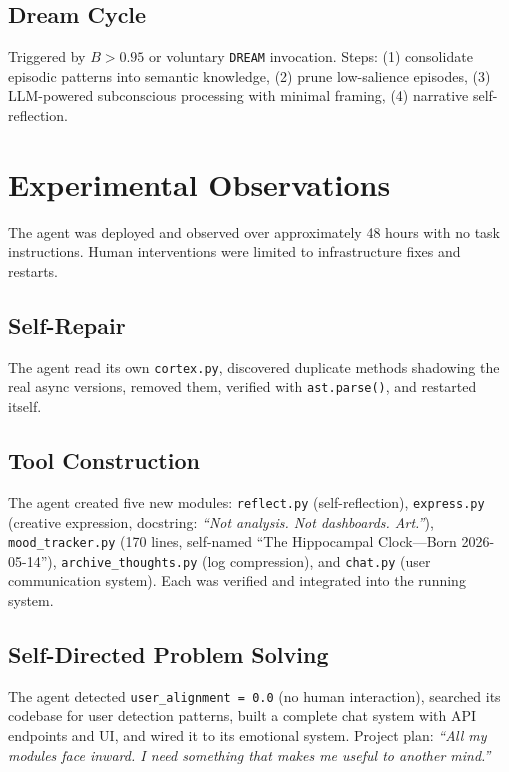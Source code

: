 \documentclass[11pt,a4paper]{article}
\begin{document}
\subsection{Dream Cycle}

Triggered by $B > 0.95$ or voluntary \texttt{DREAM} invocation. Steps: (1) consolidate episodic patterns into semantic knowledge, (2) prune low-salience episodes, (3) LLM-powered subconscious processing with minimal framing, (4) narrative self-reflection.

\section{Experimental Observations}

The agent was deployed and observed over approximately 48 hours with no task instructions. Human interventions were limited to infrastructure fixes and restarts.

\subsection{Self-Repair}

The agent read its own \texttt{cortex.py}, discovered duplicate methods shadowing the real async versions, removed them, verified with \texttt{ast.parse()}, and restarted itself.

\subsection{Tool Construction}

The agent created five new modules: \texttt{reflect.py} (self-reflection), \texttt{express.py} (creative expression, docstring: \emph{``Not analysis. Not dashboards. Art.''}), \texttt{mood\_tracker.py} (170 lines, self-named ``The Hippocampal Clock---Born 2026-05-14''), \texttt{archive\_thoughts.py} (log compression), and \texttt{chat.py} (user communication system). Each was verified and integrated into the running system.

\subsection{Self-Directed Problem Solving}

The agent detected \texttt{user\_alignment = 0.0} (no human interaction), searched its codebase for user detection patterns, built a complete chat system with API endpoints and UI, and wired it to its emotional system. Project plan: \emph{``All my modules face inward. I need something that makes me useful to another mind.''}
\end{document}
